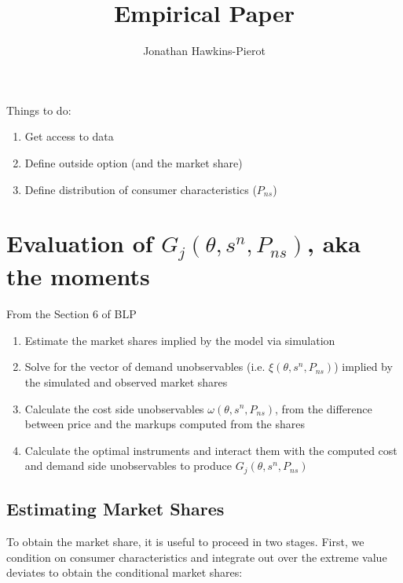 \documentclass[12pt, oneside]{article}   	%
\title{\vspace{-3cm} Empirical Paper}
\author{Jonathan Hawkins-Pierot}
\begin{document}
\maketitle
\thispagestyle{empty}

Things to do:

\begin{enumerate}

\item Get access to data

\item Define outside option (and the market share)

\item Define distribution of consumer characteristics ($P_{ns}$)


\end{enumerate}

\section*{Evaluation of $G_j(\theta, s^n, P_{ns})$, aka the moments}


From the Section 6 of BLP

\begin{enumerate}

\item Estimate the market shares implied by the model via simulation

\item Solve for the vector of demand unobservables (i.e. $\xi(\theta, s^n, P_{ns})$) implied by the simulated and observed market shares

\item Calculate the cost side unobservables $\omega(\theta, s^n, P_{ns})$, from the difference between price and the markups computed from the shares

\item Calculate the optimal instruments and interact them with the computed cost and demand side unobservables to produce $G_j(\theta, s^n, P_{ns})$ 

\end{enumerate}

\subsection{Estimating Market Shares}

To obtain the market share, it is useful to proceed in two stages. First, we condition on consumer characteristics and integrate out over the extreme value deviates to obtain the conditional market shares:
\end{document}
